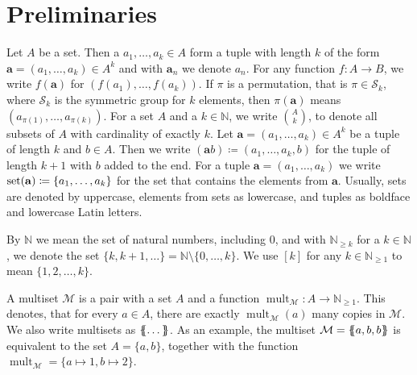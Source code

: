 \section{Preliminaries}
\label{sec:Preliminaries}

Let $A$ be a set.
Then a $a_1,\dots, a_k\in A$ form a tuple with length $k$ of the form $\mathbf a=(a_1,\dots,a_k)\in A^k$ and with $\mathbf a_n$ we denote $a_n$.
For any function $f:A\to B$, we write $f(\mathbf a)$ for $(f(a_1),\dots,f(a_k))$.
If $\pi$ is a permutation, that is $\pi\in \mathcal S_k$, where $\mathcal S_k$ is the symmetric group for $k$ elements, then $\pi(\mathbf a)$ means $(a_{\pi(1)},\dots,a_{\pi(k)})$.
For a set $A$ and a $k\in \mathbb N$, we write $\binom{A}{k}$, to denote all subsets of $A$ with cardinality of exactly $k$.
Let $\mathbf a=(a_1,\dots,a_k)\in A^k$ be a tuple of length $k$ and $b\in A$.
Then we write $(\mathbf ab)\coloneqq(a_1,\dots,a_k,b)$ for the tuple of length $k+1$ with $b$ added to the end.
For a tuple $\mathbf a=(a_1,\dots,a_k)$ we write $\operatorname{set}(\mathbf a)\coloneqq\{a_1,\dots,a_k\}$ for the set that contains the elements from $\mathbf a$.
Usually, sets are denoted by uppercase, elements from sets as lowercase, and tuples as boldface and lowercase Latin letters.

By $\mathbb N$ we mean the set of natural numbers, including $0$, and with $\mathbb N_{\geq k}$ for a $k\in \mathbb N$, we denote the set $\{k,k+1,\dots\}=\mathbb N \setminus \{0,\dots,k\}$.
We use $[k]$ for any $k\in \mathbb N_{\geq 1}$ to mean $\{1,2,\dots, k\}$.

A multiset $\mathcal M$ is a pair with a set $A$ and a function $\operatorname{mult}_{\mathcal M}:A\to \mathbb N_{\geq 1}$.
This denotes, that for every $a\in A$, there are exactly $\operatorname{mult}_{\mathcal M}(a)$ many copies in $\mathcal M$.
We also write multisets as $\left\{\kern-.35em\left\{\dots\right\}\kern-.35em\right\}$.
As an example, the multiset $\mathcal M = \left\{\kern-.35em\left\{a, b, b\right\}\kern-.35em\right\}$ is equivalent to the set $A=\{a,b\}$, together with the function $\operatorname{mult}_{\mathcal M}=\{a\mapsto 1, b\mapsto 2\}$.

